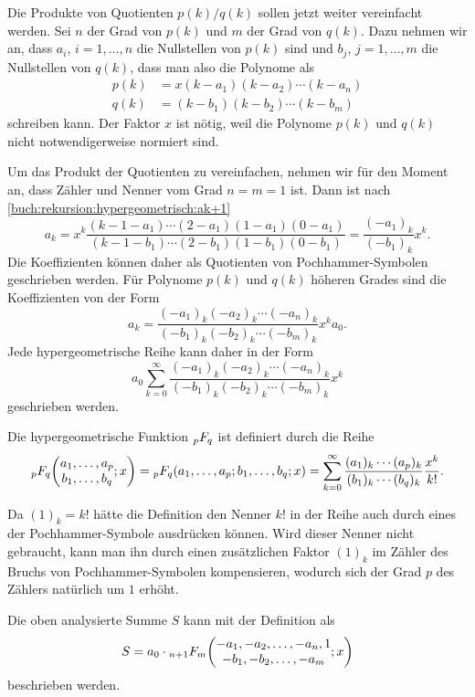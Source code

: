 Die Produkte von Quotienten $p(k)/q(k)$ sollen jetzt weiter
vereinfacht werden.
Sei $n$ der Grad von $p(k)$ und $m$ der Grad von $q(k)$.
Dazu nehmen wir an, dass $a_i$, $i=1,\dots,n$ die Nullstellen von $p(k)$ sind
und $b_j$, $j=1,\dots,m$ die Nullstellen von $q(k)$, dass man also
die Polynome als
\begin{align*}
p(k) &= x(k-a_1)(k-a_2)\cdots(k-a_n)
\\
q(k) &= (k-b_1)(k-b_2)\cdots(k-b_m)
\end{align*}
schreiben kann.
Der Faktor $x$ ist nötig, weil die Polynome $p(k)$ und $q(k)$ nicht
notwendigerweise normiert sind.

Um das Produkt der Quotienten zu vereinfachen, nehmen wir für den Moment
an, dass Zähler und Nenner vom Grad $n=m=1$ ist.
Dann ist nach 
\eqref{buch:rekursion:hypergeometrisch:ak+1}
\[
a_{k}
=
x^{k}
\frac{
(k-1-a_1) \cdots (2-a_1)(1-a_1)(0-a_1)
}{
(k-1-b_1) \cdots (2-b_1)(1-b_1)(0-b_1)
}
=
\frac{(-a_1)_k}{(-b_1)_k} x^k.
\]
Die Koeffizienten können daher als Quotienten von Pochhammer-Symbolen
geschrieben werden.
Für Polynome $p(k)$ und $q(k)$ höheren Grades sind die Koeffizienten
von der Form
\[
a_k
=
\frac{(-a_1)_k(-a_2)_k\cdots (-a_n)_k}{(-b_1)_k(-b_2)_k\cdots(-b_m)_k}
x^ka_0.
\]
Jede hypergeometrische Reihe kann daher in der Form
\[
a_0
\sum_{k=0}^\infty
\frac{(-a_1)_k(-a_2)_k\cdots (-a_n)_k}{(-b_1)_k(-b_2)_k\cdots(-b_m)_k}
x^k
\]
geschrieben werden.

\begin{definition}
\label{buch:rekursion:hypergeometrisch:def}
Die hypergeometrische Funktion
$\mathstrut_pF_q$ ist definiert durch die Reihe
\[
\mathstrut_pF_q
\biggl(
\begin{matrix}
a_1,\dots,a_p\\
b_1,\dots,b_q
\end{matrix}
;
x
\biggr)
=
\mathstrut_pF_q(a_1,\dots,a_p;b_1,\dots,b_q;x)
=
\sum_{k=0}^\infty
\frac{(a_1)_k\cdots(a_p)_k}{(b_1)_k\cdots(b_q)_k}\frac{x^k}{k!}.
\]
\end{definition}

Da $(1)_k=k!$ hätte die Definition den Nenner $k!$ in der Reihe
auch durch eines der Pochhammer-Symbole ausdrücken können.
Wird dieser Nenner nicht gebraucht, kann man ihn durch einen 
zusätzlichen Faktor $(1)_k$ im Zähler des Bruchs von Pochhammer-Symbolen
kompensieren, wodurch sich der Grad $p$ des Zählers natürlich um $1$
erhöht.

Die oben analysierte Summe $S$ kann mit der Definition als
\[
S
=
a_0
\cdot
\mathstrut_{n+1}F_m \biggl(
\begin{matrix}
-a_1,-a_2,\dots,-a_n,1\\
-b_1,-b_2,\dots,-a_m
\end{matrix}; x
\biggr)
\]
beschrieben werden.

